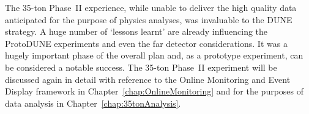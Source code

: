 The 35-ton Phase~II experience, while unable to deliver the high quality data anticipated for the purpose of physics analyses, was invaluable to the DUNE strategy.  A huge number of `lessons learnt' are already influencing the ProtoDUNE experiments and even the far detector considerations.  It was a hugely important phase of the overall plan and, as a prototype experiment, can be considered a notable success.  The 35-ton Phase~II experiment will be discussed again in detail with reference to the Online Monitoring and Event Display framework in Chapter~\ref{chap:OnlineMonitoring} and for the purposes of data analysis in Chapter~\ref{chap:35tonAnalysis}.


























